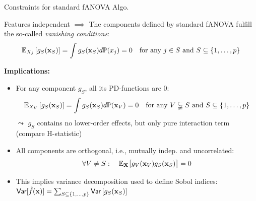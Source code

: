 \documentclass[10pt,compress,t,notes=noshow, xcolor=table]{beamer}
\newcommand{\Xv}{\mathbf{X}} %
\begin{document}
\begin{frame}{Constraints for standard fANOVA Algo.}

    \begin{theorem}
    
        Features independent $\implies$ The components defined by standard fANOVA fulfill the so-called \textit{vanishing conditions}:
        \begin{align*}
            \mathbb{E}_{X_j}\left[ g_{S}(\mathbf{x}_S) \right]
            = \int g_{S}(\mathbf{x}_S) d \mathbb{P}(x_j) = 0 \quad \text{for any } j \in S \text{ and } S \subseteq \{1, \ldots, p\}
        \end{align*}
    \end{theorem}


    
    \pause 
    \textbf{Implications:}
    \begin{itemize}
        \item 
        For any component $g_{S}$, all its PD-functions are 0:
        $$
        \mathbb{E}_{X_V}\left[ g_{S}(\mathbf{x}_S) \right]
        = \int g_{S}(\mathbf{x}_S) d \mathbb{P}(\mathbf{x}_V) = 0 \quad \text{for any } V \subsetneqq S \text{ and } S \subseteq \{1, \ldots, p\}
        $$
        $\leadsto$ $g_{S}$ contains no lower-order effects, but only pure interaction term \\
        (compare H-statistic)
        \pause
        \item All components are orthogonal, i.e., mutually indep. and uncorrelated:
        $$
        \forall V \neq S: \quad \mathbb{E}_{\Xv} \bigl[ g_{V}(\xv_V) g_{S}(\xv_S) \bigr] = 0
        $$
        \item This implies variance decomposition used to define Sobol indices:
    $ \mathsf{Var}[ \hat{f}(\mathbf{x}) ] =  \textstyle\sum_{S \subseteq \{1,\ldots,p\}}  \mathsf{Var} \left[ g_{S}(\mathbf{x}_S) \right]$
    \end{itemize}
    
\end{frame}
\end{document}
